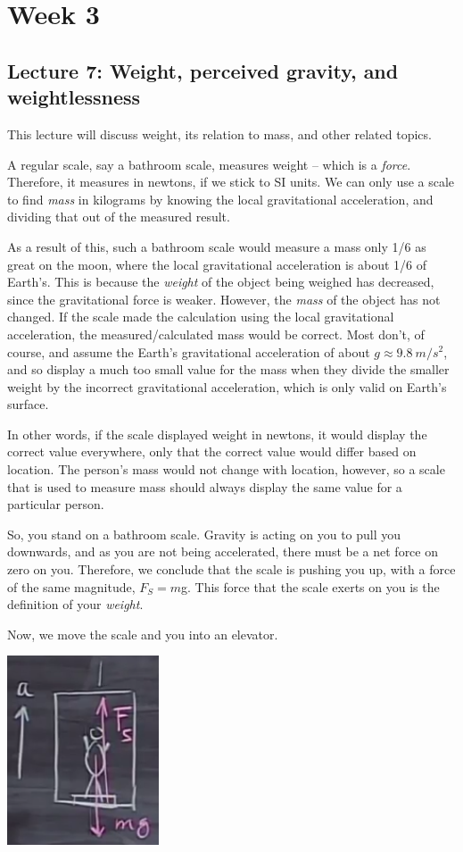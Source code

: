 \documentclass[8.01x]{subfiles}
\begin{document}
\chapter{Week 3}

\section{Lecture 7: Weight, perceived gravity, and weightlessness}

This lecture will discuss weight, its relation to mass, and other related topics.

A regular scale, say a bathroom scale, measures weight -- which is a \emph{force}. Therefore, it measures in newtons, if we stick to SI units. We can only use a scale to find \emph{mass} in kilograms by knowing the local gravitational acceleration, and dividing that out of the measured result.

As a result of this, such a bathroom scale would measure a mass only 1/6 as great on the moon, where the local gravitational acceleration is about 1/6 of Earth's. This is because the \emph{weight} of the object being weighed has decreased, since the gravitational force is weaker. However, the \emph{mass} of the object has not changed. If the scale made the calculation using the local gravitational acceleration, the measured/calculated mass would be correct. Most don't, of course, and assume the Earth's gravitational acceleration of about $g \approx \SI{9.8}{m/s^2}$, and so display a much too small value for the mass when they divide the smaller weight by the incorrect gravitational acceleration, which is only valid on Earth's surface.

In other words, if the scale displayed weight in newtons, it would display the correct value everywhere, only that the correct value would differ based on location. The person's mass would not change with location, however, so a scale that is used to measure mass should always display the same value for a particular person.

So, you stand on a bathroom scale. Gravity is acting on you to pull you downwards, and as you are not being accelerated, there must be a net force on zero on you. Therefore, we conclude that the scale is pushing you up, with a force of the same magnitude, $F_{S} = m $g. This force that the scale exerts on you is the definition of your \emph{weight}.

Now, we move the scale and you into an elevator.

\begin{center}
\includegraphics[scale=0.8]{Graphics/lec7_elevator}
\end{center}
\end{document}
